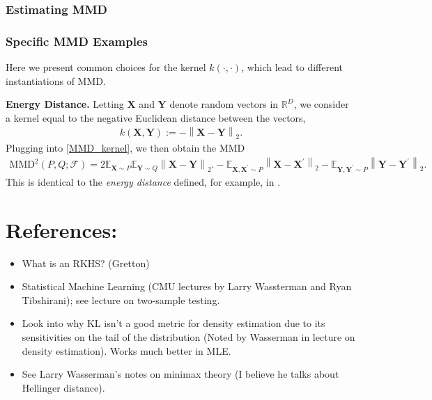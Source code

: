 \documentclass[12pt]{article}
\newcommand*{\norm}[1]{\left\lVert#1\right\rVert}
\newcommand{\E}{\mathbb{E}}
\newcommand{\R}{\mathbb{R}}
\newcommand{\Ker}{k}
\newcommand{\dimSpace}{D}
\newcommand{\MMD}{\text{MMD}}
\newcommand{\MMDSpace}{\mathcal{F}}
\newcommand{\rVec}{\mathbf{X}}
\newcommand{\rVecTwo}{\mathbf{Y}}
\begin{document}
\subsubsection{Estimating MMD}

\subsubsection{Specific MMD Examples}
Here we present common choices for the kernel $\Ker(\cdot, \cdot)$, which lead to different instantiations of MMD. 

\bigskip
\noindent
\textbf{Energy Distance.} Letting $\rVec$ and $\rVecTwo$ denote random vectors in $\R^\dimSpace$, we consider a kernel equal to the negative Euclidean distance between the vectors,
\begin{align}
\Ker(\rVec, \rVecTwo) := -\norm{\rVec - \rVecTwo}_2.
\end{align}
Plugging into \ref{MMD_kernel}, we then obtain the MMD 
\begin{align}
\MMD^2(P, Q; \MMDSpace) = 2 \E_{\rVec \sim P}\E_{\rVecTwo \sim Q}\norm{\rVec - \rVecTwo}_2. -  \E_{\rVec, \rVec^\prime \sim P}\norm{\rVec - \rVec^\prime}_2 -  \E_{\rVecTwo, \rVecTwo^\prime \sim P}\norm{\rVecTwo - \rVecTwo^\prime}_2. \label{energy_distance}
\end{align}
This is identical to the \textit{energy distance} defined, for example, in \cite{Mak}. 



\section{References:}
\begin{itemize}
\item What is an RKHS? (Gretton)
\item Statistical Machine Learning (CMU lectures by Larry Wassterman and Ryan Tibshirani); see lecture on two-sample testing. 
\item Look into why KL isn't a good metric for density estimation due to its sensitivities on the tail of the distribution (Noted by Wasserman in lecture on density estimation). Works much better in MLE. 
\item See Larry Wasserman's notes on minimax theory (I believe he talks about Hellinger distance).  
\end{itemize}
\end{document}

